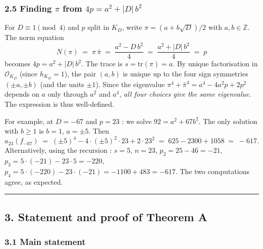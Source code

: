 \documentclass[
  11pt,
  a4paper,
]{amsart}
\begin{document}
\hypertarget{finding-pi-from-4p-a2-db2}{%
\subsubsection{\texorpdfstring{2.5 Finding \(\pi\) from \(4p = a^2 + |D|\,b^2\)}{2.5 Finding \textbackslash pi from 4p = a\^{}2 + \textbar D\textbar\textbackslash,b\^{}2}}\label{finding-pi-from-4p-a2-db2}}

For \(D \equiv 1 \pmod 4\) and \(p\) split in \(K_D\), write \(\pi = (a + b\sqrt{D})/2\) with \(a, b \in \mathbb{Z}\). The norm equation
\[
N(\pi) \;=\; \pi\,\bar\pi \;=\; \frac{a^2 - D\,b^2}{4} \;=\; \frac{a^2 + |D|\,b^2}{4} \;=\; p
\]
becomes \(4 p = a^2 + |D|\,b^2\). The trace is \(s = \mathrm{tr}(\pi) = a\). By unique factorisation in \(\mathcal{O}_{K_D}\) (since \(h_{K_D} = 1\)), the pair \((a, b)\) is unique up to the four sign symmetries \((\pm a, \pm b)\) (and the units \(\pm 1\)). Since the eigenvalue \(\pi^4 + \bar\pi^4 = a^4 - 4 a^2 p + 2 p^2\) depends on \(a\) only through \(a^2\) and \(a^4\), \emph{all four choices give the same eigenvalue}. The expression is thus well-defined.

For example, at \(D = -67\) and \(p = 23\) : we solve \(92 = a^2 + 67 b^2\). The only solution with \(b \geq 1\) is \(b = 1\), \(a = \pm 5\). Then
\[
a_{23}(f_{-67}) \;=\; (\pm 5)^4 - 4 \cdot (\pm 5)^2 \cdot 23 + 2 \cdot 23^2 \;=\; 625 - 2300 + 1058 \;=\; -617.
\]
Alternatively, using the recursion : \(s = 5\), \(n = 23\), \(p_2 = 25 - 46 = -21\), \(p_3 = 5 \cdot (-21) - 23 \cdot 5 = -220\), \(p_4 = 5 \cdot (-220) - 23 \cdot (-21) = -1100 + 483 = -617\). The two computations agree, as expected.

\begin{center}\rule{0.5\linewidth}{0.5pt}\end{center}

\hypertarget{statement-and-proof-of-theorem-a}{%
\subsection{3. Statement and proof of Theorem A}\label{statement-and-proof-of-theorem-a}}

\hypertarget{main-statement}{%
\subsubsection{3.1 Main statement}\label{main-statement}}
\end{document}
